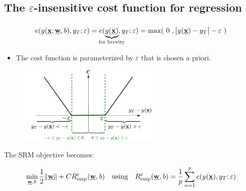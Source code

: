 \subsection{The $\varepsilon$-insensitive cost function for regression}

\begin{frame}\frametitle{\subsecname}

\slidesonly{\vspace{-5mm}}

\begin{equation}
e(y(\vec x; \vec w, b), y_{T}; \varepsilon)
= e(\underbrace{y(\vec x)}_{\mathclap{\text{for brevity}}}, y_{T}; \varepsilon)
= \max(~0~, \big|y(\vec x) - y_{T}\big|-\varepsilon~)
\end{equation}

\begin{itemize}
\item The cost function is parameterized by $\varepsilon$ that is chosen a priori.
\end{itemize}

\slidesonly{\vspace{-2mm}}

\begin{figure}[h]
     \centering
	 \includegraphics[width=0.6\textwidth]{img/cost_eps}%
	 \label{fig:cost}
\end{figure}

The SRM objective becomes:

\slidesonly{\vspace{-5mm}}

\begin{equation}
    \min_{\vec w,b} \frac{1}{2} \lVert \vec w \rVert + C R^{\varepsilon}_{\text{emp}}(\vec w,b)
    \slidesonly{
    \quad
    \text{using}\quad R^{\varepsilon}_{\text{emp}}(\vec w,b) = \frac{1}{p}\sum_{\alpha=1}^{p} e(y(\vec x), y_{T}; \varepsilon)
     }
    \label{eq:srmeps}
\end{equation}

    
\end{frame}
